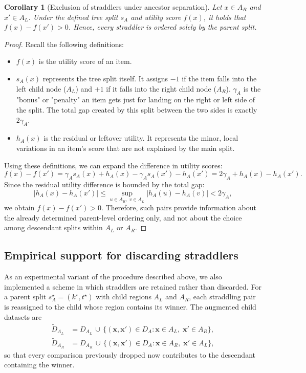 \documentclass{article}
\newtheorem{corollary}{Corollary}
\begin{document}
\begin{corollary}[Exclusion of straddlers under ancestor separation]
\label{cor:ancestor_separation}
Let $x\in A_R$ and $x'\in A_L$. Under the defined tree split $s_A$ and utility score $f(x)$, it holds that $f(x)-f(x')>0$. 
Hence, every straddler is ordered solely by the parent split.
\end{corollary}

\begin{proof}
Recall the following definitions:
\begin{itemize}
\item $f(x)$ is the utility score of an item.
\item $s_A(x)$ represents the tree split itself. It assigns $-1$ if the item falls into the left child node ($A_L$) and $+1$ if it falls into the right child node ($A_R$). $\gamma_A$ is the "bonus" or "penalty" an item gets just for landing on the right or left side of the split. The total gap created by this split between the two sides is exactly $2\gamma_A$.
\item $h_A(x)$ is the residual or leftover utility. It represents the minor, local variations in an item's score that are not explained by the main split. 
\end{itemize}

Using these definitions, we can expand the difference in utility scores:
\[
f(x)-f(x')
=
\gamma_A s_A(x)+h_A(x)-\gamma_A s_A(x')-h_A(x')
=
2\gamma_A + h_A(x)-h_A(x').
\]
Since the residual utility difference is bounded by the total gap:
\[
|h_A(x)-h_A(x')|
\le
\sup_{u\in A_R,\;v\in A_L}|h_A(u)-h_A(v)|
<
2\gamma_A,
\]
we obtain $f(x)-f(x')>0$. Therefore, such pairs provide information about the already determined parent-level ordering only, and not about the choice among descendant splits within $A_L$ or $A_R$.
\end{proof}


\subsection{Empirical support for discarding straddlers}
\label{subsec:empirical_discarding}
As an experimental variant of the procedure described above, we also implemented a scheme in which straddlers are retained rather than discarded. For a parent split $s_A^\star=(k^\star,t^\star)$ with child regions $A_L$ and $A_R$, each straddling pair is reassigned to the child whose region contains its winner. The augmented child datasets are
\begin{equation}\label{eq:winner_side_promotion}
\begin{aligned}
\tilde D_{A_L} &= D_{A_L} \,\cup\, \{(\mathbf{x},\mathbf{x}')\in D_A : \mathbf{x}\in A_L,\;\mathbf{x}'\in A_R\},\\
\tilde D_{A_R} &= D_{A_R} \,\cup\, \{(\mathbf{x},\mathbf{x}')\in D_A : \mathbf{x}\in A_R,\;\mathbf{x}'\in A_L\},
\end{aligned}
\end{equation}
so that every comparison previously dropped now contributes to the descendant containing the winner.
\end{document}
